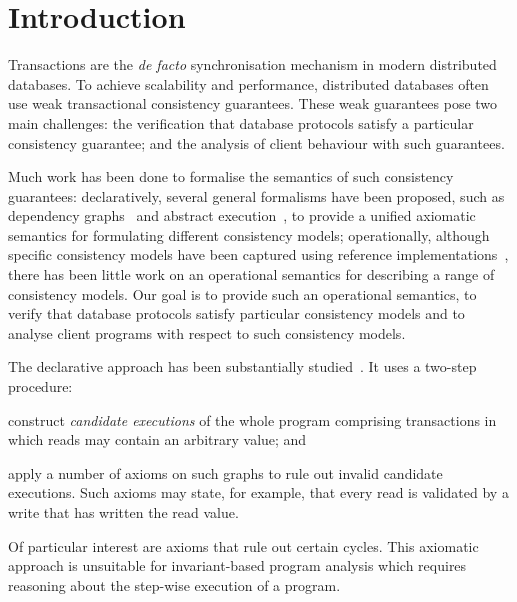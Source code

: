 \section{Introduction}
\label{sec:intro}

Transactions are the \emph{de facto} synchronisation mechanism in
modern distributed databases.  To achieve scalability and performance,
distributed databases often use weak transactional consistency
guarantees. These weak guarantees pose two main challenges: the
verification that database protocols satisfy a particular consistency
guarantee; and the analysis of client behaviour with such guarantees.

Much work has been done to formalise the semantics of such consistency
guarantees:
declaratively, several {general} formalisms have been proposed, such as
dependency graphs~\cite{adya} and abstract
execution~\cite{ev_transactions}, to provide a unified axiomatic semantics for
formulating different consistency models;
operationally, although {specific} consistency models have been
captured 
using reference implementations~\cite{si,PSI,PSI-RA,cops,ramp,bayou},
there has been little work on an 
operational semantics for describing a range of consistency models.
Our goal is to provide such an  operational semantics, 
 to verify that database protocols satisfy 
particular consistency models and to analyse client programs with
respect to 
such consistency models.  


The declarative approach has been substantially
studied~\cite{adya,ev_transactions,framework-concur,laws}. 
It uses  a two-step procedure:
\begin{enumerate*}
\item construct {\em candidate executions} of the whole program comprising
transactions in which reads may contain an arbitrary value; and 
\item apply a number of axioms on such graphs to rule out invalid candidate
executions.  Such axioms may state, for example, that every read is
validated by a write that has written the read value. 
\end{enumerate*}
Of particular interest are axioms that rule out certain cycles.
This axiomatic approach is unsuitable for invariant-based program analysis 
which requires reasoning about the step-wise execution of a program. 

